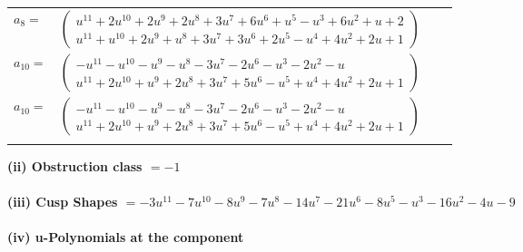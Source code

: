 \documentclass[1p]{elsarticle_modified}
\theoremstyle{definition}
\begin{document}
\begin{tabular}{m{7pt} m{180pt} m{7pt} m{180pt} }
\flushright $a_{8}=$&$\begin{pmatrix}u^{11}+2 u^{10}+2 u^9+2 u^8+3 u^7+6 u^6+u^5- u^3+6 u^2+u+2\\u^{11}+u^{10}+2 u^9+u^8+3 u^7+3 u^6+2 u^5- u^4+4 u^2+2 u+1\end{pmatrix}$ \\
\flushright $a_{10}=$&$\begin{pmatrix}- u^{11}- u^{10}- u^9- u^8-3 u^7-2 u^6- u^3-2 u^2- u\\u^{11}+2 u^{10}+u^9+2 u^8+3 u^7+5 u^6- u^5+u^4+4 u^2+2 u+1\end{pmatrix}$\\ \flushright $a_{10}=$&$\begin{pmatrix}- u^{11}- u^{10}- u^9- u^8-3 u^7-2 u^6- u^3-2 u^2- u\\u^{11}+2 u^{10}+u^9+2 u^8+3 u^7+5 u^6- u^5+u^4+4 u^2+2 u+1\end{pmatrix}$\\&\end{tabular}
\flushleft \textbf{(ii) Obstruction class $= -1$}\\~\\
\flushleft \textbf{(iii) Cusp Shapes $= -3 u^{11}-7 u^{10}-8 u^9-7 u^8-14 u^7-21 u^6-8 u^5- u^3-16 u^2-4 u-9$}\\~\\
\newpage\renewcommand{\arraystretch}{1}
\flushleft \textbf{(iv) u-Polynomials at the component}\newline \\
\end{document}
